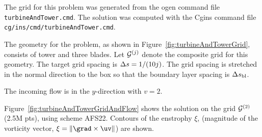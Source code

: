 {{The grid for this problem was generated from the ogen command file {\tt turbineAndTower.cmd}.
The solution was computed with the Cgins command file {\tt cg/ins/cmd/turbineAndTower.cmd}.

The geometry for the problem, as shown in Figure~\ref{fig:turbineAndTowerGrid},
consists of tower and three blades.
Let ${\mathcal G}^{(j)}$ denote the composite grid for this geometry. The target grid spacing is $\Delta s=1/(10 j)$.
The grid spacing is stretched in the normal direction to the box so that the boundary layer
spacing is $\Delta s_{\rm bl}$. 


The incoming flow is in the $y$-direction with $v=2$.


Figure~\ref{fig:turbineAndTowerGridAndFlow} shows the solution on the grid ${\mathcal G}^{(2)}$ (2.5M pts), using scheme AFS22.
Contours of the enstrophy $\xi$, (magnitude of the vorticity vector, $\xi=\| \grad\times \uv\|$) are shown.

% 


}}
